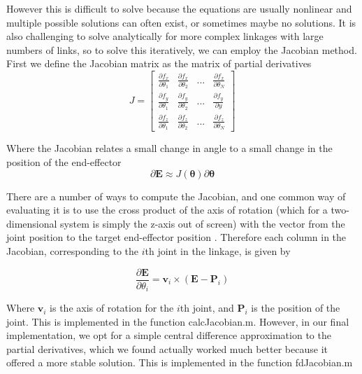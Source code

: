 \documentclass[paper=a4, fontsize=11pt]{scrartcl} %
\numberwithin{equation}{section} %
\numberwithin{figure}{section} %
\numberwithin{table}{section} %
\newcommand{\vect}[1]{\mathbf{#1}}
\newcommand{\params}{\boldsymbol{\theta}}
\newcommand{\dn}[1]{\partial{#1}}
\begin{document}
However this is difficult to solve because the equations are usually nonlinear and multiple possible solutions can often exist, or sometimes maybe no solutions. It is also challenging to solve analytically for more complex linkages with large numbers of links, so to solve this iteratively, we can employ the Jacobian method. First we define the Jacobian matrix as the matrix of partial derivatives
\vspace{1mm}
\begin{equation}
J = \left[
\begin{array}{cccc}
\frac{\dn{f_x}}{\dn{\theta_1}} & \frac{\dn{f_x}}{\dn{\theta_2}} & ... & \frac{\dn{f_x}}{\dn{\theta_N}} 
\\[0.2cm]
\frac{\dn{f_y}}{\dn{\theta_1}} & \frac{\dn{f_y}}{\dn{\theta_2}} & ... & \frac{\dn{f_y}}{\dn{y}} 
\\[0.2cm]
\frac{\dn{f_z}}{\dn{\theta_1}} & \frac{\dn{f_z}}{\dn{\theta_2}} & ... & \frac{\dn{f_z}}{\dn{\theta_N}}
\end{array}
\right]
\end{equation}

Where the Jacobian relates a small change in angle to a small change in the position of the end-effector
\vspace{1mm}
\begin{equation}
\partial \vect{E} \approx J(\params) \partial \params
\end{equation}

There are a number of ways to compute the Jacobian, and one common way of evaluating it is to use the cross product of the axis of rotation (which for a two-dimensional system is simply the z-axis out of screen) with the vector from the joint position to the target end-effector position \cite{Buss09}. Therefore each column in the Jacobian, corresponding to the $i$th joint in the linkage, is given by

\begin{equation}
\frac{\dn{\vect{E}}}{\dn{\theta_i}} = \vect{v}_i \times (\vect{E} - \vect{P}_i)
\end{equation}

Where $\vect{v}_i$ is the axis of rotation for the $i$th joint, and $\vect{P}_i$ is the position of the joint. This is implemented in the function calcJacobian.m. However, in our final implementation, we opt for a simple central difference approximation to the partial derivatives, which we found actually worked much better because it offered a more stable solution. This is implemented in the function fdJacobian.m
\end{document}
